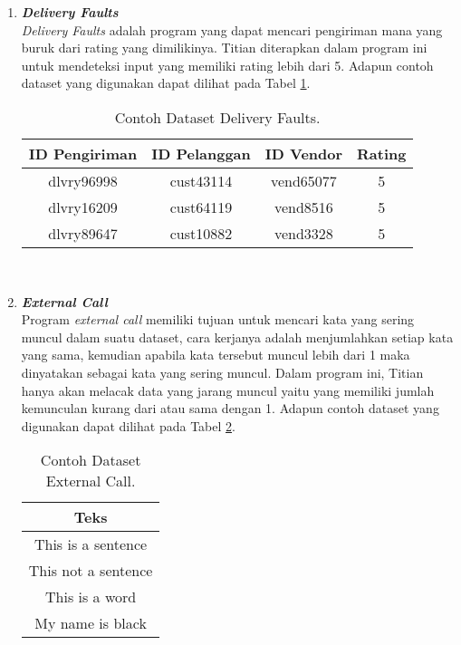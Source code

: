 \begin{enumerate}
      \item \emph{\textbf{Delivery Faults}} \\
            \emph{Delivery Faults} adalah program yang dapat mencari pengiriman mana yang buruk dari rating yang dimilikinya. Titian diterapkan dalam program ini untuk mendeteksi input yang memiliki rating lebih dari 5.
            Adapun contoh dataset yang digunakan dapat 
            dilihat pada Tabel \ref{tb:deliveryfaultsdataset}.

            \begin{longtable}{|c|c|c|c|}
                  \caption{Contoh Dataset Delivery Faults.}
                  \label{tb:deliveryfaultsdataset} \\
                  \hline
                  \rowcolor[HTML]{C0C0C0}
                  \textbf{ID Pengiriman} & \textbf{ID Pelanggan} & \textbf{ID Vendor} & \textbf{Rating} \\
                  \hline
                  dlvry96998 & cust43114 & vend65077 & 5 \\
                  dlvry16209 & cust64119 & vend8516 & 5 \\
                  dlvry89647 & cust10882 & vend3328 & 5 \\
                  \hline
            \end{longtable}

      \

      \item \emph{\textbf{External Call}} \\
            Program \emph{external call} memiliki tujuan untuk mencari kata yang sering muncul dalam suatu dataset, cara kerjanya adalah menjumlahkan setiap kata yang sama, kemudian apabila kata tersebut muncul lebih dari 1 maka dinyatakan sebagai kata yang sering muncul. Dalam program ini, Titian hanya akan melacak data yang jarang muncul yaitu yang memiliki jumlah kemunculan kurang dari atau sama dengan 1.
            Adapun contoh dataset yang digunakan dapat 
            dilihat pada Tabel \ref{tb:externalcalldataset}.

            \begin{longtable}{|c|}
                  \caption{Contoh Dataset External Call.}
                  \label{tb:externalcalldataset} \\
                  \hline
                  \rowcolor[HTML]{C0C0C0}
                  \textbf{Teks} \\
                  \hline
                  This is a sentence \\
                  This not a sentence \\
                  This is a word \\
                  My name is black \\
                  \hline
            \end{longtable}


\end{enumerate}
